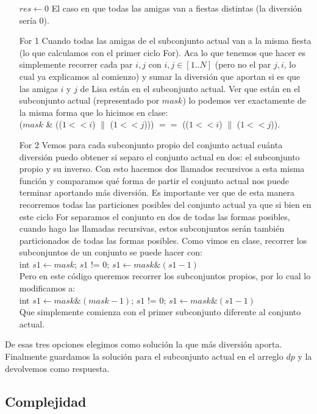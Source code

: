 \begin{itemize}
    \item [$res \gets 0$] El caso en que todas las amigas van a fiestas distintas (la diversión sería 0).
    \item [For 1] Cuando todas las amigas de el subconjunto actual van a la misma fiesta (lo que calculamos con el primer ciclo For). Aca lo que tenemos que hacer es simplemente recorrer cada par $i,j$ con $i,j \in [1..N]$ (pero no el par $j,i$, lo cual ya explicamos al comienzo) y sumar la diversión que aportan si es que las amigas $i$ y $j$ de Lisa están en el subconjunto actual. Ver que están en el subconjunto actual (representado por $mask$) lo podemos ver exactamente de la misma forma que lo hicimos en clase: \\ 
    ($mask$ \& (($1 << i$) $\|$ ($1 << j$))) $==$ (($1 << i$) $\|$ ($1 << j$)).
    \item [For 2] Vemos para cada subconjunto propio del conjunto actual cuánta diversión puedo obtener si separo el conjunto actual en dos: el subconjunto propio y su inverso. Con esto hacemos dos llamados recursivos a esta misma función y comparamos qué forma de partir el conjunto actual nos puede terminar aportando más diversión. Es importante ver que de esta manera recorremos todas las particiones posibles del conjunto actual ya que si bien en este ciclo For separamos el conjunto en dos de todas las formas posibles, cuando hago las llamadas recursivas, estos subconjuntos serán también particionados de todas las formas posibles. Como vimos en clase, recorrer los subconjuntos de un conjunto se puede hacer con: \\
    int $s1 \gets mask$; $s1$ != $0$; $s1 \gets mask \& (s1-1)$ \\
    Pero en este código queremos recorrer los subconjuntos propios, por lo cual lo modificamos a: \\
    int $s1 \gets mask \& (mask-1)$; $s1$ != $0$; $s1 \gets mask \& (s1-1)$ \\
    Que simplemente comienza con el primer subconjunto diferente al conjunto actual.
\end{itemize}

De esas tres opciones elegimos como solución la que más diversión aporta. \\
Finalmente guardamos la solución para el subconjunto actual en el arreglo $dp$ y la devolvemos como respuesta.

\subsection{Complejidad}

